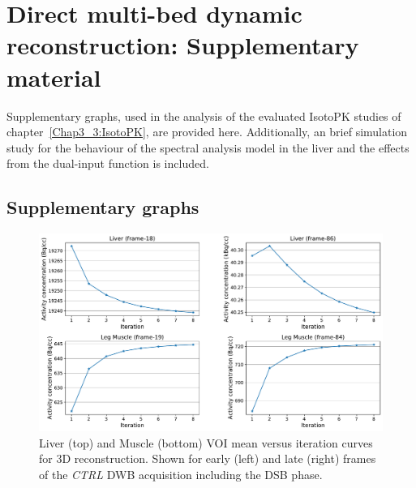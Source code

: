 \chapter{Direct multi-bed dynamic reconstruction: Supplementary material}
\label{chap:AppendixC}

Supplementary graphs, used in the analysis of the evaluated IsotoPK studies of chapter~\ref{Chap3_3:IsotoPK}, are provided here. Additionally, an brief simulation study for the behaviour of the spectral analysis model in the liver and the effects from the dual-input function is included.

\section*{Supplementary graphs}

\begin{figure} [ht!]
\centering
\includegraphics[scale=0.5,angle=0]{3_Results/3_3_DWB_Reconstruction/figures/3_3_IsotoPK_CTRL_DWB_3D_Convergence.pdf}
\caption{Liver (top) and Muscle (bottom) VOI mean versus iteration curves for 3D reconstruction. Shown for early (left) and late (right) frames of the \textit{CTRL} DWB acquisition including the DSB phase.}
\label{fig_3_3:IsotoPK_CTRL_DWB_4D_Convergence}
\end{figure} 

